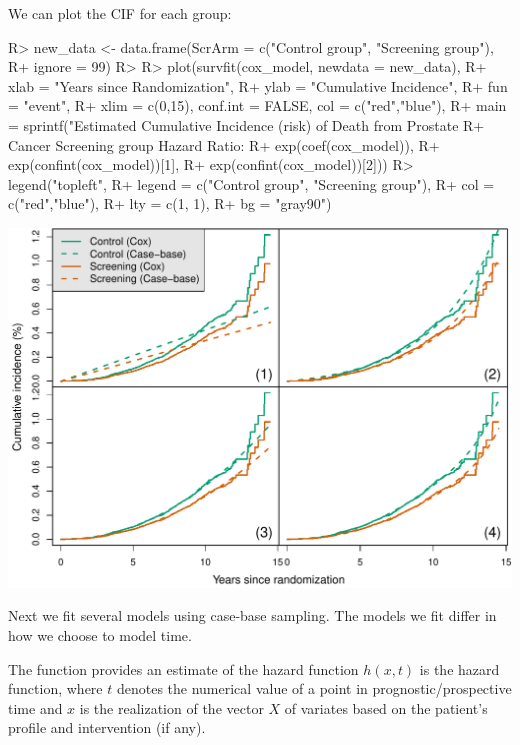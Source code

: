 \documentclass[
]{jss}
\begin{document}
We can plot the CIF for each group:

\begin{CodeChunk}

\begin{CodeInput}
R> new_data <- data.frame(ScrArm = c("Control group", "Screening group"),
R+                        ignore = 99)
R> 
R> plot(survfit(cox_model, newdata = new_data),
R+      xlab = "Years since Randomization", 
R+      ylab = "Cumulative Incidence", 
R+      fun = "event",
R+      xlim = c(0,15), conf.int = FALSE, col = c("red","blue"), 
R+      main = sprintf("Estimated Cumulative Incidence (risk) of Death from Prostate 
R+                     Cancer Screening group Hazard Ratio: %
R+                     exp(coef(cox_model)), 
R+                     exp(confint(cox_model))[1], 
R+                     exp(confint(cox_model))[2]))
R> legend("topleft", 
R+        legend = c("Control group", "Screening group"), 
R+        col = c("red","blue"),
R+        lty = c(1, 1), 
R+        bg = "gray90")
\end{CodeInput}


\begin{center}\includegraphics{../figures/erspc-cox-cif-1} \end{center}

\end{CodeChunk}

Next we fit several models using case-base sampling. The models we fit
differ in how we choose to model time.

The  function provides an estimate of the hazard
function \(h(x, t)\) is the hazard function, where \(t\) denotes the
numerical value of a point in prognostic/prospective time and \(x\) is
the realization of the vector \(X\) of variates based on the patient's
profile and intervention (if any).
\end{document}
